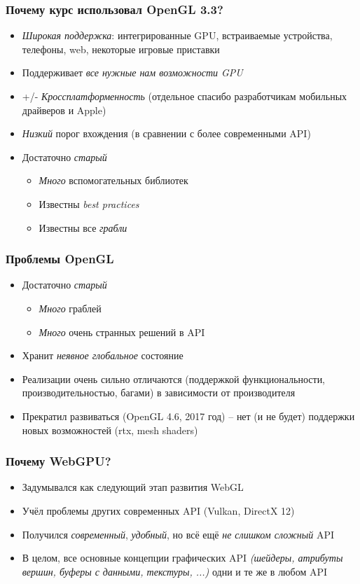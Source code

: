 \documentclass[10pt]{beamer}
\begin{document}
\begin{frame}
\frametitle{Почему курс использовал OpenGL 3.3?}
\pause
\begin{itemize}
\item \textit{Широкая поддержка}: интегрированные GPU, встраиваемые устройства, телефоны, web, некоторые игровые приставки
\pause
\item Поддерживает \textit{все нужные нам возможности GPU}
\pause
\item +/- \textit{Кроссплатформенность} \pause (отдельное спасибо разработчикам мобильных драйверов и Apple)
\pause
\item \textit{Низкий} порог вхождения (в сравнении с более современными API)
\pause
\item Достаточно \textit{старый}
\begin{itemize}
\item \textit{Много} вспомогательных библиотек
\item Известны \textit{best practices}
\item Известны все \textit{грабли}
\end{itemize}
\end{itemize}
\end{frame}

\begin{frame}
\frametitle{Проблемы OpenGL}
\pause
\begin{itemize}
\item Достаточно \textit{старый}
\begin{itemize}
\item \textit{Много} граблей
\item \textit{Много} очень странных решений в API
\end{itemize}
\pause
\item Хранит \textit{неявное глобальное} состояние
\pause
\item Реализации очень сильно отличаются (поддержкой функциональности, производительностью, багами) в зависимости от производителя
\pause
\item Прекратил развиваться (OpenGL 4.6, 2017 год) -- нет (и не будет) поддержки новых возможностей (rtx, mesh shaders)
\end{itemize}
\end{frame}

\begin{frame}
\frametitle{Почему WebGPU?}
\pause
\begin{itemize}
\item Задумывался как следующий этап развития WebGL
\pause
\item Учёл проблемы других современных API (Vulkan, DirectX 12)
\pause
\item Получился \textit{современный}, \textit{удобный}, но всё ещё \textit{не слишком сложный} API
\pause
\item В целом, все основные концепции графических API \textit{(шейдеры, атрибуты вершин, буферы с данными, текстуры, ...)} одни и те же в любом API
\end{itemize}
\end{frame}
\end{document}
